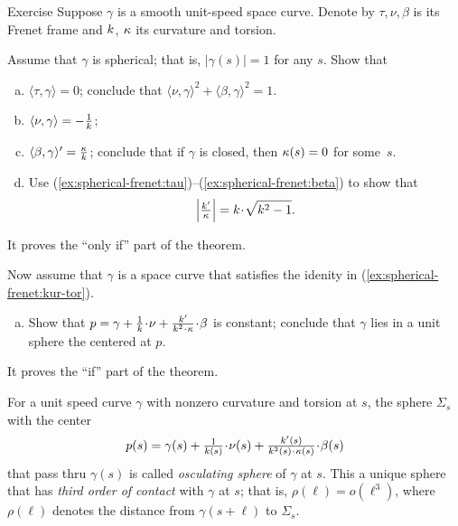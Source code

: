 \begin{thm}{Exercise}\label{ex:spherical-frenet}
Suppose $\gamma$ is a smooth unit-speed space curve.
Denote by $\tau,\nu,\beta$ 
is its Frenet frame and $k$, $\kappa$ its curvature and torsion.

\smallskip

Assume that $\gamma$ is spherical; that is, $|\gamma(s)|=1$ for any $s$.
Show that

\begin{enumerate}[(a)]
\item\label{ex:spherical-frenet:tau} $\langle\tau,\gamma\rangle=0$; conclude that $\langle\nu,\gamma\rangle^2+\langle\beta,\gamma\rangle^2=1$.
\item\label{ex:spherical-frenet:nu} $\langle\nu,\gamma\rangle=-\tfrac1{k}$;
\item\label{ex:spherical-frenet:beta} $\langle\beta,\gamma\rangle'=\tfrac{\kappa}{k}$; conclude that if $\gamma$ is closed, then $\kappa(s)=0$ for some~$s$.
\item\label{ex:spherical-frenet:kur-tor} Use (\ref{ex:spherical-frenet:tau})--(\ref{ex:spherical-frenet:beta}) to show that 
\[\left|\tfrac{\kur'}{\tor}\right|=\kur\cdot\sqrt{\kur^2-1}.\]
\setcounter{lastnumber}{\value{enumi}}
\end{enumerate}
It proves the ``only if'' part of the theorem.

\smallskip

Now assume that $\gamma$ is a space curve that satisfies the idenity in (\ref{ex:spherical-frenet:kur-tor}).
\begin{enumerate}[(a)]
\setcounter{enumi}{\value{lastnumber}}
\item Show that $p=\gamma+\tfrac1\kur\cdot \nu+\tfrac{\kur'}{\kur^2\cdot\tor}\cdot\beta$ is constant; conclude that $\gamma$ lies in a unit sphere the centered at $p$.
\end{enumerate}
It proves the ``if'' part of the theorem.
\end{thm}

For a unit speed curve $\gamma$ with nonzero curvature and torsion at $s$,
the sphere $\Sigma_s$ with the center
\[p(s)=\gamma(s)+\tfrac1{\kur(s)}\cdot \nu(s)+\tfrac{\kur'(s)}{\kur^2(s)\cdot\tor(s)}\cdot\beta(s)\]
that pass thru $\gamma(s)$ is called \emph{osculating sphere} of $\gamma$ at $s$.
This a unique sphere that has \emph{third order of contact} with $\gamma$ at $s$;
that is, $\rho(\ell)=o(\ell^3)$, where $\rho(\ell)$ denotes the distance from $\gamma(s+\ell)$ to $\Sigma_s$.
 
